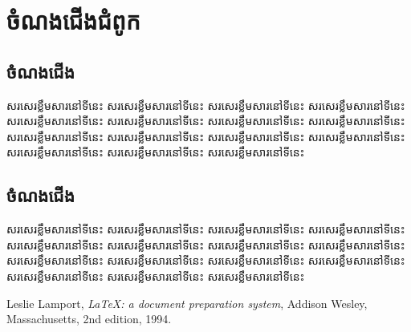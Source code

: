 \documentclass[a4paper,12pt]{book}
\theoremstyle{theorem}
\theoremstyle{definition}
\theoremstyle{remark}
\begin{document}
	\chapter{ចំណងជើងជំពូក}
	\section{ចំណងជើង}
	សរសេរខ្លឹមសារនៅទីនេះ សរសេរខ្លឹមសារនៅទីនេះ សរសេរខ្លឹមសារនៅទីនេះ សរសេរខ្លឹមសារនៅទីនេះ សរសេរខ្លឹមសារនៅទីនេះ សរសេរខ្លឹមសារនៅទីនេះ សរសេរខ្លឹមសារនៅទីនេះ សរសេរខ្លឹមសារនៅទីនេះ សរសេរខ្លឹមសារនៅទីនេះ សរសេរខ្លឹមសារនៅទីនេះ សរសេរខ្លឹមសារនៅទីនេះ សរសេរខ្លឹមសារនៅទីនេះ សរសេរខ្លឹមសារនៅទីនេះ សរសេរខ្លឹមសារនៅទីនេះ សរសេរខ្លឹមសារនៅទីនេះ 
	\section{ចំណងជើង}
	សរសេរខ្លឹមសារនៅទីនេះ សរសេរខ្លឹមសារនៅទីនេះ សរសេរខ្លឹមសារនៅទីនេះ សរសេរខ្លឹមសារនៅទីនេះ សរសេរខ្លឹមសារនៅទីនេះ សរសេរខ្លឹមសារនៅទីនេះ សរសេរខ្លឹមសារនៅទីនេះ សរសេរខ្លឹមសារនៅទីនេះ សរសេរខ្លឹមសារនៅទីនេះ សរសេរខ្លឹមសារនៅទីនេះ សរសេរខ្លឹមសារនៅទីនេះ សរសេរខ្លឹមសារនៅទីនេះ សរសេរខ្លឹមសារនៅទីនេះ សរសេរខ្លឹមសារនៅទីនេះ សរសេរខ្លឹមសារនៅទីនេះ 
	\backmatter
	\begin{thebibliography}{99}
		Leslie Lamport,
		\emph{\LaTeX: a document preparation system},
		Addison Wesley, Massachusetts,
		2nd edition,
		1994.
	\end{thebibliography}
\end{document}
